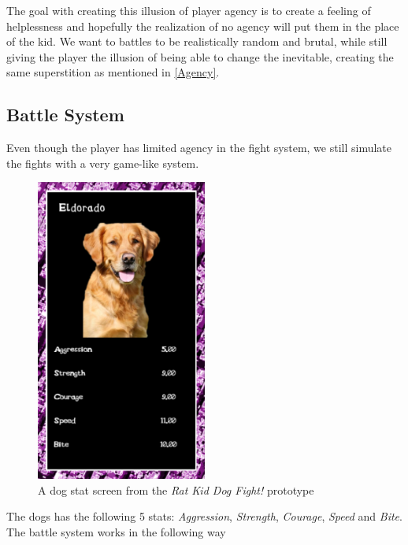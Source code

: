 The goal with creating this illusion of player agency is to create a feeling of helplessness and hopefully the realization of no agency will put them in the place of the kid. 
We want to battles to be realistically random and brutal, while still giving the player the illusion of being able to change the inevitable, creating the same superstition as mentioned in \ref{Agency}.\\

\subsection{Battle System}
Even though the player has limited agency in the fight system, we still simulate the fights with a very game-like system.\\

\begin{figure}[h!]
	\centering
    \includegraphics[width=0.5\textwidth]{DogStats.png}
    \caption{A dog stat screen from the \textit{Rat Kid Dog Fight!} prototype}
    \label{fig:DogStatScreen}
\end{figure}


The dogs has the following 5 stats: \textit{Aggression}, \textit{Strength}, \textit{Courage}, \textit{Speed} and \textit{Bite}.\\

The battle system works in the following way



